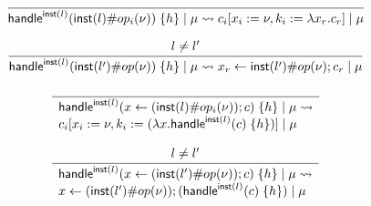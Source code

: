 \[\frac{
	\begin{array}{l}
	\end{array}
}{
	\mathsf{handle}^{\mathsf{inst}(l)} ( \mathsf{inst}(l) \# op_i(\nu) ) \; \{h\} \; | \; \mu \rightsquigarrow c_i[x_i := \nu, k_i := \lambda x_r . c_r] \; | \; \mu
}\]

\[\frac{
	\begin{array}{l}
	l \neq l'
	\end{array}
}{
	\mathsf{handle}^{\mathsf{inst}(l)} ( \mathsf{inst}(l') \# op(\nu) ) \; \{h\} \; | \; \mu \rightsquigarrow x_r \leftarrow \mathsf{inst}(l') \# op(\nu) ; c_r \; | \; \mu
}\]

\[\frac{
	\begin{array}{l}
	\end{array}
}{
	\begin{array}{l}
	\mathsf{handle}^{\mathsf{inst}(l)} ( x \leftarrow (\mathsf{inst}(l) \# op_i(\nu)) ; c ) \; \{h\} \; | \; \mu \rightsquigarrow \\
	c_i[x_i := \nu, k_i := (\lambda x . \mathsf{handle}^{\mathsf{inst}(l)} ( c ) \; \{h\})] \; | \; \mu
	\end{array}
}\]

\[\frac{
	\begin{array}{l}
	l \neq l'
	\end{array}
}{
	\begin{array}{l}
	\mathsf{handle}^{\mathsf{inst}(l)} ( x \leftarrow (\mathsf{inst}(l') \# op(\nu)) ; c ) \; \{h\} \; | \; \mu \rightsquigarrow \\
	x \leftarrow (\mathsf{inst}(l') \# op(\nu)) ; (\mathsf{handle}^{\mathsf{inst}(l)} ( c ) \; \{h\}) \; | \; \mu
	\end{array}
}\]
